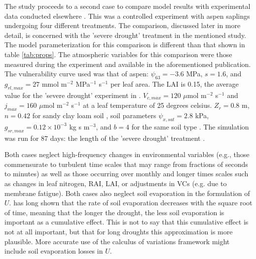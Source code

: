 \documentclass[utf8]{frontiersSCNS} %
\begin{document}
The study proceeds to a second case to compare model results with experimental data conducted elsewhere \citep{venturas_2018}. This was a controlled experiment with aspen saplings undergoing four different treatments. The comparison, discussed later in more detail, is concerned with the 'severe drought' treatment in the mentioned study. The model parameterization for this comparison is different than that shown in table \ref{tab:props}. The atmospheric variables for this comparison were those measured during the experiment and available in the aforementioned publication. The vulnerability curve used was that of aspen: $\psi_{63} = -3.6$ MPa, $s=1.6$, and $g_{rl,max} = 27$ mmol m$^{-2}$ MPa$^{-1}$ s$^{-1}$ per leaf area. The LAI is 0.15, the average value for the 'severe drought' experiment in \citep{venturas_2018}. $V_{c,max} = 120$ $\mu$mol m$^{-2}$ s$^{-1}$ and $j_{max} = 160$ $\mu$mol m$^{-2}$ s$^{-1}$ at a leaf temperature of 25 degrees celsius. $Z_r = 0.8$ m, $n = 0.42$ for sandy clay loam soil \cite{clapp_empirical_1978}, soil parameters $\psi_{x,sat} = 2.8$ kPa, $g_{sr,max} = 0.12 \times 10^{-3}$ kg s m$^{-3}$, and $b = 4$ for the same soil type \citep{campbell_introduction_2012}. The simulation was run for 87 days: the length of the 'severe drought' treatment \citep{venturas_2018}.

Both cases neglect high-frequency changes in environmental variables (e.g., those commensurate to turbulent time scales that may range from fractions of seconds to minutes) as well as those occurring over monthly and longer times scales such as changes in leaf nitrogen, RAI, LAI, or adjustments in VCs (e.g. due to membrane fatigue). Both cases also neglect soil evaporation in the formulation of $U$. \citet{gardner_1959} has long shown that the rate of soil evaporation decreases with the square root of time, meaning that the longer the drought, the less soil evaporation is important as a cumulative effect. This is not to say that this cumulative effect is not at all important, but that for long droughts this approximation is more plausible. More accurate use of the calculus of variations framework might include soil evaporation losses in $U$.
\end{document}
